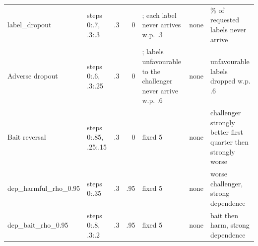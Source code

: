 \begin{longtable}{@{}p{3.3cm}p{2.9cm}rr>{\raggedright\arraybackslash}p{2.4cm}>{\raggedright\arraybackslash}p{1.1cm}>{\raggedright\arraybackslash}p{2.7cm}@{}}
label\_dropout & steps 0:.7, .3:.3 & .3 & 0 & 5; each label never arrives w.p. .3 & none & 30\% of requested labels never arrive \\
Adverse dropout & steps 0:.6, .3:.25 & .3 & 0 & 5; labels unfavourable to the challenger never arrive w.p. .6 & none & unfavourable labels dropped w.p. .6 \\
Bait reversal & steps 0:.85, .25:.15 & .3 & 0 & fixed 5 & none & challenger strongly better first quarter then strongly worse \\
dep\_harmful\_rho\_0.95 & steps 0:.35 & .3 & .95 & fixed 5 & none & worse challenger, strong dependence \\
dep\_bait\_rho\_0.95 & steps 0:.8, .3:.2 & .3 & .95 & fixed 5 & none & bait then harm, strong dependence \\
\bottomrule
\end{longtable}
